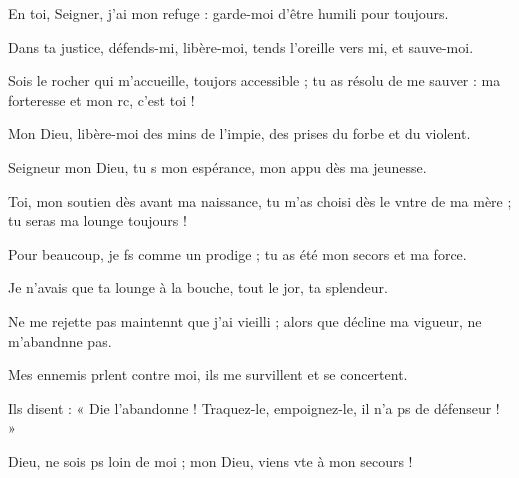 \item En toi, Seigner, j’ai mon refuge :\psstar{} garde-moi d’être humili pour toujours.
\item Dans ta justice, défends-mi, libère-moi,\psstar{} tends l’oreille vers mi, et sauve-moi.
\item Sois le rocher qui m’accueille, toujors accessible ;\psstar{} tu as résolu de me sauver : ma forteresse et mon rc, c’est toi !
\item Mon Dieu, libère-moi des mins de l’impie,\psstar{} des prises du forbe et du violent.
\item Seigneur mon Dieu, tu s mon espérance,\psstar{} mon appu dès ma jeunesse.
\item Toi, mon soutien dès avant ma naissance,\pscross{} tu m’as choisi dès le vntre de ma mère ;\psstar{} tu seras ma lounge toujours !
\item Pour beaucoup, je fs comme un prodige ;\psstar{} tu as été mon secors et ma force.
\item Je n’avais que ta lounge à la bouche,\psstar{} tout le jor, ta splendeur.
\item Ne me rejette pas maintennt que j’ai vieilli ;\psstar{} alors que décline ma vigueur, ne m’abandnne pas.
\item Mes ennemis prlent contre moi,\psstar{} ils me survillent et se concertent.
\item Ils disent : « Die l’abandonne !\psstar{} Traquez-le, empoignez-le, il n’a ps de défenseur ! »
\item Dieu, ne sois ps loin de moi ;\psstar{} mon Dieu, viens vte à mon secours !